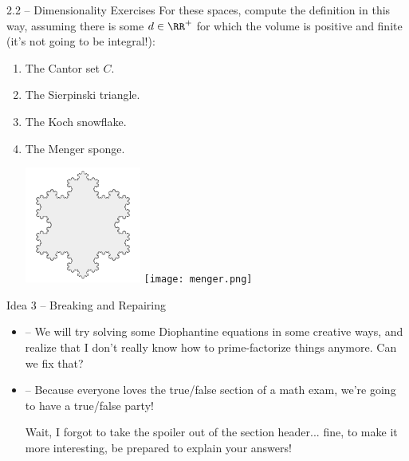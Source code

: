 \documentclass{beamer}
\theoremstyle{plain}
\begin{document}
\begin{frame}{2.2 -- Dimensionality Exercises}
 For these spaces, compute the definition in this way, assuming there is some $d
 \in \RR^+$ for which the volume is positive and finite (it's not going to be
 integral!):
 \begin{enumerate}
     \item The Cantor set $C$. 
  \item The Sierpinski triangle.
  \item The Koch snowflake.
  \item The Menger sponge. 
    \begin{center}
      \includegraphics[width=0.3\textwidth]{koch.png}
      \texttt{[image: menger.png]}
    \end{center}
 \end{enumerate}
\end{frame}


\begin{frame}{Idea 3 -- Breaking and Repairing}
 \begin{itemize}
    \item {} -- We will try solving some Diophantine equations in some
    creative ways, and realize that I don't really know how to prime-factorize
    things anymore. Can we fix that? 

  \item {} -- Because everyone loves the true/false section of a math 
    exam, we're going to have a true/false party!

    Wait, I forgot to take the spoiler out of the section header... fine, to
    make it more interesting, be prepared to explain your answers!
 
 \end{itemize} 
\end{frame}
\end{document}
